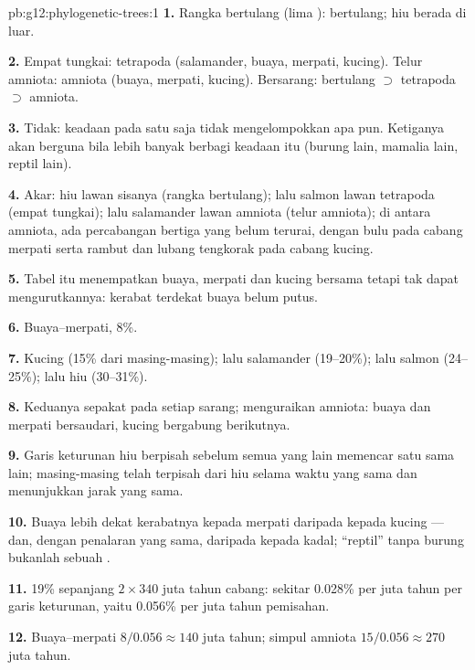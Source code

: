 \begin{solution}{pb:g12:phylogenetic-trees:1}
\textbf{1.} Rangka bertulang (lima ):  bertulang;
hiu berada di luar.

\textbf{2.} Empat tungkai: tetrapoda (salamander, buaya, merpati,
kucing). Telur amniota: amniota (buaya, merpati, kucing). Bersarang:
 bertulang $\supset$ tetrapoda $\supset$ amniota.

\textbf{3.} Tidak: keadaan pada satu  saja tidak
mengelompokkan apa pun. Ketiganya akan berguna bila lebih banyak
 berbagi keadaan itu (burung lain, mamalia lain, reptil lain).

\textbf{4.} Akar: hiu lawan sisanya (rangka bertulang); lalu salmon
lawan tetrapoda (empat tungkai); lalu salamander lawan amniota (telur
amniota); di antara amniota, ada percabangan bertiga yang belum
terurai, dengan bulu pada cabang merpati serta rambut dan lubang
tengkorak pada cabang kucing.

\textbf{5.} Tabel itu menempatkan buaya, merpati dan kucing bersama
tetapi tak dapat mengurutkannya: kerabat terdekat buaya belum putus.

\textbf{6.} Buaya--merpati, 8\%.

\textbf{7.} Kucing (15\% dari masing-masing); lalu salamander
(19--20\%); lalu salmon (24--25\%); lalu hiu (30--31\%).

\textbf{8.} Keduanya sepakat pada setiap sarang;  menguraikan
amniota: buaya dan merpati bersaudari, kucing bergabung berikutnya.

\textbf{9.} Garis keturunan hiu berpisah sebelum semua yang lain
memencar satu sama lain; masing-masing telah terpisah dari hiu selama
waktu yang sama dan menunjukkan jarak yang sama.

\textbf{10.} Buaya lebih dekat kerabatnya kepada merpati daripada
kepada kucing --- dan, dengan penalaran yang sama, daripada kepada
kadal; ``reptil'' tanpa burung bukanlah sebuah .

\textbf{11.} 19\% sepanjang $2 \times 340$ juta tahun cabang: sekitar
0.028\% per juta tahun per garis keturunan, yaitu 0.056\% per juta
tahun pemisahan.

\textbf{12.} Buaya--merpati $8/0.056 \approx 140$ juta tahun; simpul
amniota $15/0.056 \approx 270$ juta tahun.


\end{solution}
